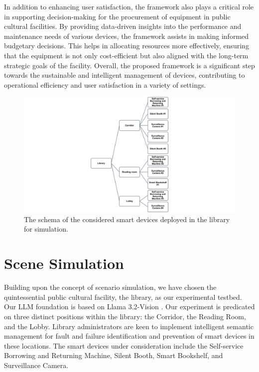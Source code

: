 \documentclass[preprint,12pt]{elsarticle}
\begin{document}
In addition to enhancing user satisfaction, the framework also plays a critical role in supporting decision-making for the procurement of equipment in public cultural facilities. By providing data-driven insights into the performance and maintenance needs of various devices, the framework assists in making informed budgetary decisions. This helps in allocating resources more effectively, ensuring that the equipment is not only cost-efficient but also aligned with the long-term strategic goals of the facility. Overall, the proposed framework is a significant step towards the sustainable and intelligent management of devices, contributing to operational efficiency and user satisfaction in a variety of settings.


\begin{figure}[h]
	\centering
	\includegraphics[width=\linewidth]{trial_schema.png}
	\caption{The schema of the considered smart devices deployed in the library for simulation.}
	\label{trial_schema}
\end{figure}



\section{Scene Simulation}
Building upon the concept of scenario simulation, we have chosen the quintessential public cultural facility, the library, as our experimental testbed. Our LLM foundation is based on Llama 3.2-Vision \cite{meta-llama-models}. Our experiment is predicated on three distinct positions within the library: the Corridor, the Reading Room, and the Lobby. Library administrators are keen to implement intelligent semantic management for fault and failure identification and prevention of smart devices in these locations. The smart devices under consideration include the Self-service Borrowing and Returning Machine, Silent Booth, Smart Bookshelf, and Surveillance Camera.
\end{document}
